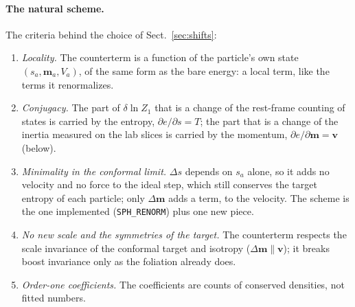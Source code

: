 \documentclass[11pt,aps,preprint,nofootinbib,superscriptaddress,tightenlines]{revtex4-2}
\def\Sect#1{Sect.~\ref{#1}}
\let\oldparagraph\paragraph
\renewcommand{\paragraph}{\par\bigskip\oldparagraph}
\begin{document}
\paragraph{The natural scheme.}  The criteria behind the choice of \Sect{sec:shifts}:
\begin{enumerate}
\item \emph{Locality.}  The counterterm is a function of the particle's own state $(s_a,\bm m_a,V_a)$, of the same form as the bare energy: a local term, like the terms it
  renormalizes.
\item \emph{Conjugacy.}  The part of $\delta\ln Z_1$ that is a change of the rest-frame counting of states is carried by the entropy, $\partial e/\partial s=T$; the part that is a change of
  the inertia measured on the lab slices is carried by the momentum, $\partial e/\partial\bm m=\bm v$ (below).
\item \emph{Minimality in the conformal limit.}  $\Delta s$ depends on $s_a$ alone, so it adds no velocity and no force to the ideal step, which still conserves the target
  entropy of each particle; only $\Delta\bm m$ adds a term, to the velocity.  The scheme is the one implemented (\texttt{SPH\_RENORM}) plus one new piece.
\item \emph{No new scale and the symmetries of the target.}  The counterterm respects the scale invariance of the conformal target and isotropy ($\Delta\bm m\parallel\bm v$); it breaks
  boost invariance only as the foliation already does.
\item \emph{Order-one coefficients.}  The coefficients are counts of conserved densities, not fitted numbers.
\end{enumerate}
\end{document}
